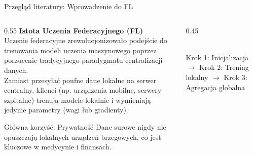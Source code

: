 \documentclass[9pt,aspectratio=169]{beamer}
\begin{document}
\begin{frame}{Przegląd literatury: Wprowadzenie do FL}
\begin{columns}[T]
\begin{column}{0.55\textwidth}
\textbf{Istota Uczenia Federacyjnego (FL)}\\[4pt]
Uczenie federacyjne zrewolucjonizowało podejście do trenowania modeli uczenia maszynowego poprzez porzucenie tradycyjnego paradygmatu centralizacji danych.\\[6pt]
Zamiast przesyłać poufne dane lokalne na serwer centralny, klienci (np. urządzenia mobilne, serwery szpitalne) trenują modele lokalnie i wymieniają jedynie parametry (wagi lub gradienty).\\[8pt]
\begin{infobox}{Główna korzyść: Prywatność}
Dane surowe nigdy nie opuszczają lokalnych urządzeń brzegowych, co jest kluczowe w medycynie i finansach.
\end{infobox}
\end{column}
\begin{column}{0.45\textwidth}
\centering
{}
\\[4pt]
\footnotesize Krok 1: Inicjalizacja $\to$ Krok 2: Trening lokalny $\to$ Krok 3: Agregacja globalna
\end{column}
\end{columns}
\end{frame}
\end{document}
